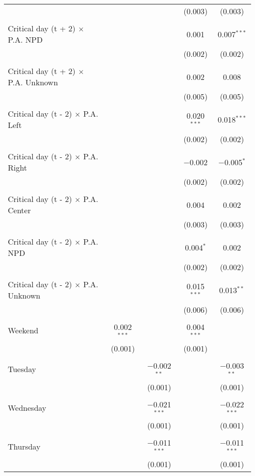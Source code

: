 \documentclass[
]{article}
\begin{document}
\begin{table}[!htbp]
{\begin{tabular}{@{\extracolsep{5pt}}lcccc}
  &  &  & (0.003) & (0.003) \\ 
  & & & & \\ 
 Critical day (t + 2) $\times$ P.A. NPD &  &  & 0.001 & 0.007$^{***}$ \\ 
  &  &  & (0.002) & (0.002) \\ 
  & & & & \\ 
 Critical day (t + 2) $\times$ P.A. Unknown &  &  & 0.002 & 0.008 \\ 
  &  &  & (0.005) & (0.005) \\ 
  & & & & \\ 
 Critical day (t - 2) $\times$ P.A. Left &  &  & 0.020$^{***}$ & 0.018$^{***}$ \\ 
  &  &  & (0.002) & (0.002) \\ 
  & & & & \\ 
 Critical day (t - 2) $\times$ P.A. Right &  &  & $-$0.002 & $-$0.005$^{*}$ \\ 
  &  &  & (0.002) & (0.002) \\ 
  & & & & \\ 
 Critical day (t - 2) $\times$ P.A. Center &  &  & 0.004 & 0.002 \\ 
  &  &  & (0.003) & (0.003) \\ 
  & & & & \\ 
 Critical day (t - 2) $\times$ P.A. NPD &  &  & 0.004$^{*}$ & 0.002 \\ 
  &  &  & (0.002) & (0.002) \\ 
  & & & & \\ 
 Critical day (t - 2) $\times$ P.A. Unknown &  &  & 0.015$^{***}$ & 0.013$^{**}$ \\ 
  &  &  & (0.006) & (0.006) \\ 
  & & & & \\ 
 Weekend & 0.002$^{***}$ &  & 0.004$^{***}$ &  \\ 
  & (0.001) &  & (0.001) &  \\ 
  & & & & \\ 
 Tuesday &  & $-$0.002$^{**}$ &  & $-$0.003$^{**}$ \\ 
  &  & (0.001) &  & (0.001) \\ 
  & & & & \\ 
 Wednesday &  & $-$0.021$^{***}$ &  & $-$0.022$^{***}$ \\ 
  &  & (0.001) &  & (0.001) \\ 
  & & & & \\ 
 Thursday &  & $-$0.011$^{***}$ &  & $-$0.011$^{***}$ \\ 
  &  & (0.001) &  & (0.001) \\ 

\end{tabular}}
\end{table}
\end{document}
